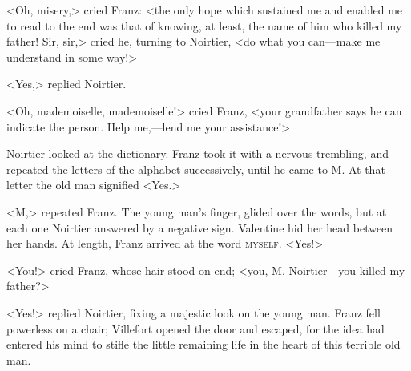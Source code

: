  <Oh, misery,> cried Franz: <the only hope which sustained me and enabled me to read to the end was that of knowing, at least, the name of him who killed my father! Sir, sir,> cried he, turning to Noirtier, <do what you can—make me understand in some way!> 

 <Yes,> replied Noirtier. 

 <Oh, mademoiselle, mademoiselle!> cried Franz, <your grandfather says he can indicate the person. Help me,—lend me your assistance!> 

 Noirtier looked at the dictionary. Franz took it with a nervous trembling, and repeated the letters of the alphabet successively, until he came to M. At that letter the old man signified <Yes.> 

 <M,> repeated Franz. The young man's finger, glided over the words, but at each one Noirtier answered by a negative sign. Valentine hid her head between her hands. At length, Franz arrived at the word \textsc{myself}.  <Yes!> 

 <You!> cried Franz, whose hair stood on end; <you, M. Noirtier—you killed my father?> 

 <Yes!> replied Noirtier, fixing a majestic look on the young man. Franz fell powerless on a chair; Villefort opened the door and escaped, for the idea had entered his mind to stifle the little remaining life in the heart of this terrible old man.
